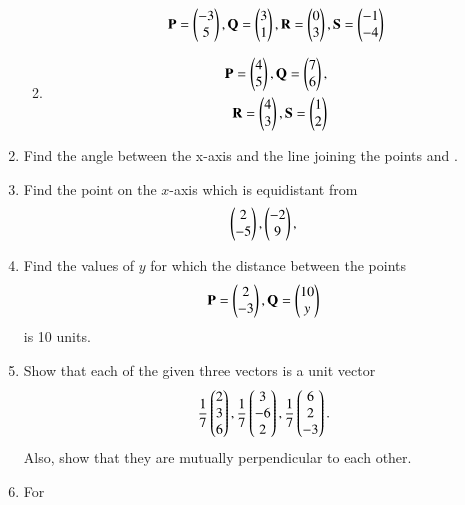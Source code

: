 \begin{enumerate}[label=\arabic*.,ref=\thesubsection.\theenumi]
\begin{enumerate}
\begin{align}
\mathbf{P} = \begin{pmatrix}-3\\5\end{pmatrix}, \mathbf{Q} =\begin{pmatrix}3\\1\end{pmatrix},
\mathbf{R} =\begin{pmatrix}0\\3\end{pmatrix}, \mathbf{S} =\begin{pmatrix}-1\\-4\end{pmatrix}
\end{align}
\item 
\begin{align}
\mathbf{P} = \begin{pmatrix}4\\5\end{pmatrix}, \mathbf{Q} =\begin{pmatrix}7\\6\end{pmatrix},
\\
\mathbf{R} =\begin{pmatrix}4\\3\end{pmatrix}, \mathbf{S} =\begin{pmatrix}1\\2\end{pmatrix}
\end{align}
\end{enumerate}
\solution

\item Find the angle between the x-axis and the line joining the points  and .
\solution

\item Find the point on the $x$-axis which is equidistant from 
\begin{align}
\begin{pmatrix}2\\-5\end{pmatrix}, \begin{pmatrix}-2\\9\end{pmatrix},
\end{align}
\solution

\item Find the values of $y$ for which the distance between the points 
\begin{align}
\mathbf{P} = \begin{pmatrix}2\\-3\end{pmatrix}, \mathbf{Q} = \begin{pmatrix}10\\y\end{pmatrix}
\end{align}
is 10 units.
\solution

\item Show that each of the given three vectors is a unit vector
\begin{align}
 \frac{1}{7}\begin{pmatrix}2\\3\\6\end{pmatrix}, \frac{1}{7}\begin{pmatrix}3\\-6\\2\end{pmatrix}, \frac{1}{7}\begin{pmatrix}6\\2\\-3\end{pmatrix}.
\end{align}
Also,  show that they are mutually perpendicular to each other.
\item For 

\end{enumerate}
